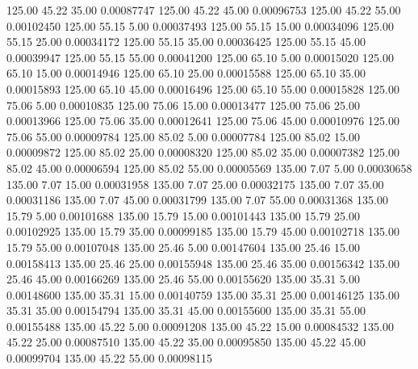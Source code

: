    125.00     45.22     35.00     0.00087747
    125.00     45.22     45.00     0.00096753
    125.00     45.22     55.00     0.00102450
    125.00     55.15      5.00     0.00037493
    125.00     55.15     15.00     0.00034096
    125.00     55.15     25.00     0.00034172
    125.00     55.15     35.00     0.00036425
    125.00     55.15     45.00     0.00039947
    125.00     55.15     55.00     0.00041200
    125.00     65.10      5.00     0.00015020
    125.00     65.10     15.00     0.00014946
    125.00     65.10     25.00     0.00015588
    125.00     65.10     35.00     0.00015893
    125.00     65.10     45.00     0.00016496
    125.00     65.10     55.00     0.00015828
    125.00     75.06      5.00     0.00010835
    125.00     75.06     15.00     0.00013477
    125.00     75.06     25.00     0.00013966
    125.00     75.06     35.00     0.00012641
    125.00     75.06     45.00     0.00010976
    125.00     75.06     55.00     0.00009784
    125.00     85.02      5.00     0.00007784
    125.00     85.02     15.00     0.00009872
    125.00     85.02     25.00     0.00008320
    125.00     85.02     35.00     0.00007382
    125.00     85.02     45.00     0.00006594
    125.00     85.02     55.00     0.00005569
    135.00      7.07      5.00     0.00030658
    135.00      7.07     15.00     0.00031958
    135.00      7.07     25.00     0.00032175
    135.00      7.07     35.00     0.00031186
    135.00      7.07     45.00     0.00031799
    135.00      7.07     55.00     0.00031368
    135.00     15.79      5.00     0.00101688
    135.00     15.79     15.00     0.00101443
    135.00     15.79     25.00     0.00102925
    135.00     15.79     35.00     0.00099185
    135.00     15.79     45.00     0.00102718
    135.00     15.79     55.00     0.00107048
    135.00     25.46      5.00     0.00147604
    135.00     25.46     15.00     0.00158413
    135.00     25.46     25.00     0.00155948
    135.00     25.46     35.00     0.00156342
    135.00     25.46     45.00     0.00166269
    135.00     25.46     55.00     0.00155620
    135.00     35.31      5.00     0.00148600
    135.00     35.31     15.00     0.00140759
    135.00     35.31     25.00     0.00146125
    135.00     35.31     35.00     0.00154794
    135.00     35.31     45.00     0.00155600
    135.00     35.31     55.00     0.00155488
    135.00     45.22      5.00     0.00091208
    135.00     45.22     15.00     0.00084532
    135.00     45.22     25.00     0.00087510
    135.00     45.22     35.00     0.00095850
    135.00     45.22     45.00     0.00099704
    135.00     45.22     55.00     0.00098115
